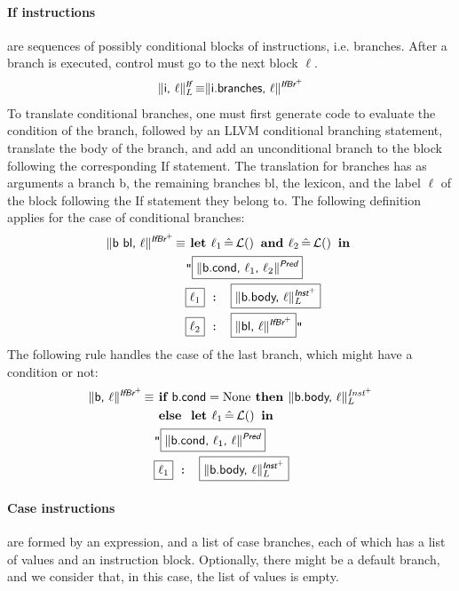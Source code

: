\documentclass{llncs}
\newcommand{\trad}[2]{\ensuremath{\lVert \textsf{#1} \rVert^{\textit{#2}}}}
\DeclareMathOperator{\isdef}{\equiv}
\DeclareMathOperator{\lbl}{\mathcal{L}()}
\newcommand{\llvm}[1]{\texttt{#1}}
\newcommand{\B}[1]{\textsf{#1}}
\newcommand{\ListOf}[1]{$\mbox{#1}^+$}
\newcommand{\IF}[0]{\textbf{ if }}
\newcommand{\ELSE}[0]{\textbf{ else }}
\newcommand{\THEN}[0]{\textbf{ then }}
\newcommand{\LET}[0]{\textbf{ let }}
\DeclareMathOperator{\BE}{\hat{=}}
\newcommand{\IN}[0]{\textbf{ in }}
\newcommand{\AND}[0]{\textbf{ and }}
\newcommand{\PH}[1]{\framebox{$#1$}}
\begin{document}
\paragraph{If instructions} are sequences of possibly conditional blocks of
instructions, i.e. branches. After a branch is executed, control must go
to the next block $\ell$.
\begin{align*}
  \trad{i, $\ell$}{\B{If}}_L \isdef \trad{i.branches, $\ell$}{\ListOf{\B{IfBr}}}
\end{align*}
To translate conditional branches, one must first generate code to evaluate the
condition of the branch, followed by an LLVM conditional branching statement,
translate the body of the branch, and add an unconditional branch to the block
following the corresponding \B{If} statement.  The translation for branches has
as arguments a branch \B{b}, the remaining branches \B{bl}, the lexicon, and the
label $\ell$ of the block following the \B{If} statement they belong to. The
following definition applies for the case of conditional branches:
\begin{align*}
\begin{split}
  \trad{\B{b bl}, $\ell$}{\ListOf{\B{IfBr}}} \isdef & \LET \ell_1 \BE \lbl \AND \ell_2 \BE \lbl \IN \\
  & \llvm{"\PH{\trad{b.cond, $\ell_1$, $\ell_2$}{\B{Pred}}} } \\
  & \llvm{\PH{\ell_1} : \PH{\trad{b.body, $\ell$}{\ListOf{\B{Inst}}}_L}} \\
  & \llvm{\PH{\ell_2} : \PH{\trad{bl, $\ell$}{\ListOf{\B{IfBr}}}}"} \\
\end{split}
\end{align*}
The following rule handles the case of the last branch, which might have a condition or not:
\begin{align*}
\begin{split}
  \trad{\B{b}, $\ell$}{\ListOf{\B{IfBr}}} \isdef & \IF \B{b.cond} = \text{None} \THEN
  \trad{b.body, $\ell$}{\ListOf{Inst}}_L\\
  & \ELSE \LET \ell_1 \BE \lbl \IN \\
  & \llvm{"\PH{\trad{b.cond, $\ell_1$, $\ell$}{\B{Pred}}} } \\
  & \llvm{\PH{\ell_1} : \PH{\trad{b.body, $\ell$}{\ListOf{\B{Inst}}}_L}}
\end{split}
\end{align*}

\paragraph{Case instructions} are formed by an expression, and a list of case
branches, each of which has a list of values and an instruction block.
Optionally, there might be a default branch, and we consider that, in this case,
the list of values is empty.
\end{document}
